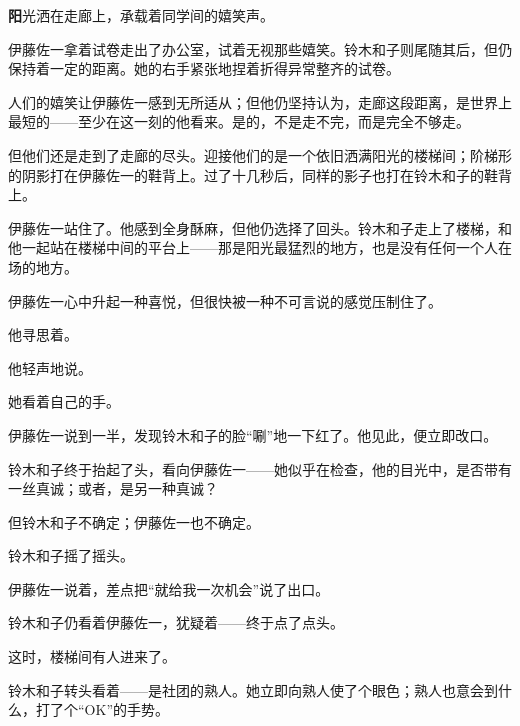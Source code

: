 
\AddSymbolsC
\pagecolor{purple!10!gray}
\color{white}
\quad\quad \lettrine[,lraise=0.2,lhang=0.5]{\textbf{阳}}{光}洒在走廊上，承载着同学间的嬉笑声。

伊藤佐一拿着试卷走出了办公室，试着无视那些嬉笑。铃木和子则尾随其后，但仍保持着一定的距离。她的右手紧张地捏着折得异常整齐的试卷。

人们的嬉笑让伊藤佐一感到无所适从；但他仍坚持认为，走廊这段距离，是世界上最短的——至少在这一刻的他看来。是的，不是走不完，而是完全不够走。

但他们还是走到了走廊的尽头。迎接他们的是一个依旧洒满阳光的楼梯间；阶梯形的阴影打在伊藤佐一的鞋背上。过了十几秒后，同样的影子也打在铃木和子的鞋背上。


伊藤佐一站住了。他感到全身酥麻，但他仍选择了回头。铃木和子走上了楼梯，和他一起站在楼梯中间的平台上——那是阳光最猛烈的地方，也是没有任何一个人在场的地方。


伊藤佐一心中升起一种喜悦，但很快被一种不可言说的感觉压制住了。

他寻思着。

他轻声地说。

她看着自己的手。


伊藤佐一说到一半，发现铃木和子的脸“唰”地一下红了。他见此，便立即改口。


铃木和子终于抬起了头，看向伊藤佐一——她似乎在检查，他的目光中，是否带有一丝真诚；或者，是另一种真诚？

但铃木和子不确定；伊藤佐一也不确定。

铃木和子摇了摇头。


伊藤佐一说着，差点把“就给我一次机会”说了出口。

铃木和子仍看着伊藤佐一，犹疑着——终于点了点头。

这时，楼梯间有人进来了。


铃木和子转头看着——是社团的熟人。她立即向熟人使了个眼色；熟人也意会到什么，打了个“OK”的手势。

